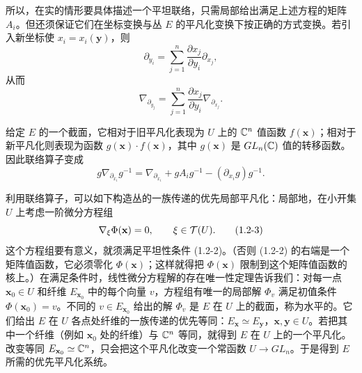 所以，在实的情形要具体描述一个平坦联络，只需局部给出满足上述方程的矩阵 $A_i$。但还须保证它们在坐标变换与丛 $E$ 的平凡化变换下按正确的方式变换。若引入新坐标使 $x_i=x_i(\mathbf{y})$，则
\[
    \partial_{y_i}=\sum_{j=1}^{n}\frac{\partial x_j}{\partial y_i}\partial_{x_j},
\]
从而
\[
    \nabla_{\partial_{y_j}}=\sum_{j=1}^{n}\frac{\partial x_j}{\partial y_i}\nabla_{\partial_{x_j}}.
\]

给定 $E$ 的一个截面，它相对于旧平凡化表现为 $U$ 上的 $\mathbb{C}^n$ 值函数 $f(\mathbf{x})$；相对于新平凡化则表现为函数 $g(\mathbf{x})\cdot f(\mathbf{x})$，其中 $g(\mathbf{x})$ 是 $GL_n(\mathbb{C})$ 值的转移函数。因此联络算子变成
\[
    g\nabla_{\partial_{x_i}}g^{-1}
    =\nabla_{\partial_{x_i}}+gA_ig^{-1}-(\partial_{x_i}g)g^{-1}.
\]

利用联络算子，可以如下构造丛的一族传递的优先局部平凡化：局部地，在小开集 $U$ 上考虑一阶微分方程组
\begin{equation}
    \nabla_\xi\Phi(\mathbf{x})=0,\qquad \xi\in\mathcal{T}(U).
    \tag{1.2-3}
\end{equation}
这个方程组要有意义，就须满足平坦性条件 (1.2-2)。（否则 (1.2-2) 的右端是一个矩阵值函数，它必须零化 $\Phi(\mathbf{x})$；这样就得把 $\Phi(\mathbf{x})$ 限制到这个矩阵值函数的核上。）在满足条件时，线性微分方程解的存在唯一性定理告诉我们：对每一点 $\mathbf{x}_0\in U$ 和纤维 $E_{\mathbf{x}_0}$ 中的每个向量 $v$，方程组有唯一的局部解 $\Phi_v$ 满足初值条件 $\Phi(\mathbf{x}_0)=v$。不同的 $v\in E_{\mathbf{x}_0}$ 给出的解 $\Phi_v$ 是 $E$ 在 $U$ 上的截面，称为水平的。它们给出 $E$ 在 $U$ 各点处纤维的一族传递的优先等同：$E_{\mathbf{x}}\simeq E_{\mathbf{y}}$，$\mathbf{x},\mathbf{y}\in U$。若把其中一个纤维（例如 $\mathbf{x}_0$ 处的纤维）与 $\mathbb{C}^n$ 等同，就得到 $E$ 在 $U$ 上的一个平凡化。改变等同 $E_{\mathbf{x}_0}\simeq\mathbb{C}^n$，只会把这个平凡化改变一个常函数 $U\to GL_n$。于是得到 $E$ 所需的优先平凡化系统。


